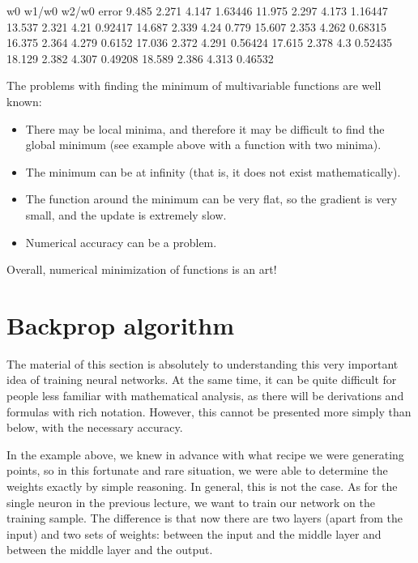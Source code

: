 \documentclass[letterpaper,10pt,english]{jupyterBook}
\begin{document}
\begin{sphinxVerbatim}[commandchars=\\\{\}]
   w0   w1/w0  w2/w0 error
\PYGZhy{}9.485 2.271 \PYGZhy{}4.147 1.63446
\PYGZhy{}11.975 2.297 \PYGZhy{}4.173 1.16447
\PYGZhy{}13.537 2.321 \PYGZhy{}4.21 0.92417
\PYGZhy{}14.687 2.339 \PYGZhy{}4.24 0.779
\PYGZhy{}15.607 2.353 \PYGZhy{}4.262 0.68315
\PYGZhy{}16.375 2.364 \PYGZhy{}4.279 0.6152
\PYGZhy{}17.036 2.372 \PYGZhy{}4.291 0.56424
\PYGZhy{}17.615 2.378 \PYGZhy{}4.3 0.52435
\PYGZhy{}18.129 2.382 \PYGZhy{}4.307 0.49208
\PYGZhy{}18.589 2.386 \PYGZhy{}4.313 0.46532
\end{sphinxVerbatim}

\sphinxAtStartPar
The problems with finding the minimum of multivariable functions are well known:
\begin{itemize}
\item {} 
\sphinxAtStartPar
There may be local minima, and therefore it may be difficult to find the global minimum (see example above with a function with two minima).

\item {} 
\sphinxAtStartPar
The minimum can be at infinity (that is, it does not exist mathematically).

\item {} 
\sphinxAtStartPar
The function around the minimum can be very flat, so the gradient is very small, and the update is extremely slow.

\item {} 
\sphinxAtStartPar
Numerical accuracy can be a problem.

\end{itemize}

\sphinxAtStartPar
Overall, numerical minimization of functions is an art!


\section{Backprop algorithm}
\label{\detokenize{docs/backprop:backprop-algorithm}}
\sphinxAtStartPar
The material of this section is absolutely  to understanding this very important idea of training neural networks. At the same time, it can be quite difficult for people less familiar with mathematical analysis, as there will be derivations and formulas with rich notation. However, this cannot be presented more simply than below, with the necessary accuracy.

\sphinxAtStartPar
In the example above, we knew in advance with what recipe we were generating points, so in this fortunate and rare situation, we were able to determine the weights exactly by simple reasoning. In general, this is not the case. As for the single neuron in the previous lecture, we want to train our network on the training sample. The difference is that now there are two layers (apart from the input) and two sets of weights: between the input and the middle layer and between the middle layer and the output.
\end{document}
